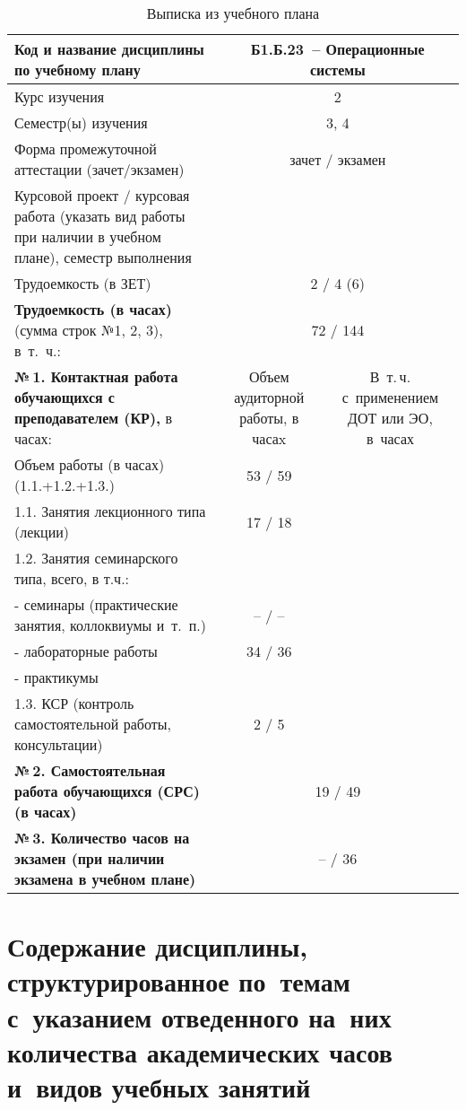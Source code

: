 \documentclass[a4paper,12pt]{article}
\begin{document}
\begin{table}[H]
\caption{Выписка из учебного плана} 
\begin{tabular}{|p{9cm}|c|c|}
\hline
Код и название дисциплины по учебному плану & \multicolumn{2}{p{6cm}|}{Б1.Б.23\ -- Операционные системы }\\
\hline
Курс изучения &\multicolumn{2}{c|}{ 2 }\\
\hline
Семестр(ы) изучения &\multicolumn{2}{c|}{ 3, 4 }\\
\hline
Форма промежуточной аттестации (зачет/экзамен) &\multicolumn{2}{c|}{ зачет / экзамен }\\
\hline
Курсовой проект / курсовая работа (указать вид работы при наличии в учебном плане), семестр выполнения &\multicolumn{2}{c|}{ }\\
\hline
Трудоемкость (в ЗЕТ) &\multicolumn{2}{c|}{ 2 / 4 (6) }\\
\hline
{\bf Трудоемкость (в часах)} (сумма строк №1, 2, 3), в~т.~ч.:& \multicolumn{2}{c|}{72 / 144}\\
\hline
\textbf{№\,1. Контактная работа обучающихся с преподавателем (КР),} в часах:
& \multicolumn{1}{p{3cm}|}{\centering Объем аудиторной работы, в часаx}
& \multicolumn{1}{p{3cm}|}{\centering\arraybackslash В~т.\,ч. с~применением ДОТ или ЭО, в~часах}\\
\hline  
Объем работы (в часах) (1.1.+1.2.+1.3.)& 53 / 59 & \\
\hline
1.1. Занятия лекционного типа (лекции) & 17 / 18 & \\
\hline
1.2. Занятия семинарского типа, всего, в т.ч.: & & \\
\hline
- семинары (практические занятия, коллоквиумы и~т.~п.)  & – / – & \\
\hline
- лабораторные работы& 34 / 36 & \\
\hline
- практикумы & & \\
\hline
1.3. КСР (контроль самостоятельной работы, консультации)& 2 / 5 & \\
\hline
{\bf №\,2. Самостоятельная работа обучающихся (СРС) (в часах)}& \multicolumn{2}{c|}{19 / 49}\\
\hline
{\bf №\,3. Количество часов на экзамен (при наличии экзамена в учебном плане)}& \multicolumn{2}{c|}{– / 36}\\
\hline
\end{tabular}
\end{table}



\newpage
\section{Содержание дисциплины, структурированное по~темам с~указанием отведенного на~них количества академических часов и~видов учебных занятий}
\end{document}

